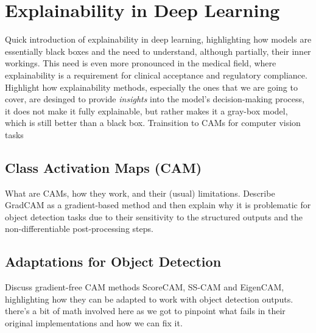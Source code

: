 \section{Explainability in Deep Learning}
Quick introduction of explainability in deep learning, highlighting how models are essentially black boxes and the need to understand, although partially, their inner workings. This need is even more pronounced in the medical field, where explainability is a requirement for clinical acceptance and regulatory compliance. Highlight how explainability methods, especially the ones that we are going to cover, are desinged to provide \emph{insights} into the model's decision-making process, it does not make it fully explainable, but rather makes it a gray-box model, which is still better than a black box.
Trainsition to CAMs for computer vision tasks

\subsection{Class Activation Maps (CAM)}
What are CAMs, how they work, and their (usual) limitations. Describe GradCAM as a gradient-based method and then explain why it is problematic for object detection tasks due to their sensitivity to the structured outputs and the non-differentiable post-processing steps. 

\subsection{Adaptations for Object Detection}
Discuss gradient-free CAM methods ScoreCAM, SS-CAM and EigenCAM, highlighting how they can be adapted to work with object detection outputs. there's a bit of math involved here as we got to pinpoint what fails in their original implementations and how we can fix it.
